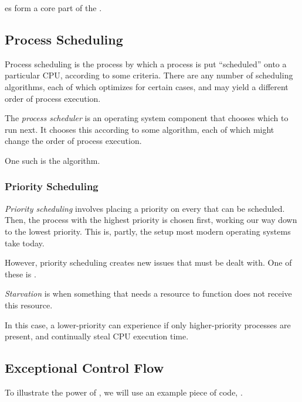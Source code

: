 es form a core part of the .

\subsection{Process Scheduling}\label{subsec:Process_Scheduling}
Process scheduling is the process by which a process is put ``scheduled'' onto a particular CPU, according to some criteria.
There are any number of scheduling algorithms, each of which optimizes for certain cases, and may yield a different order of process execution.
\begin{definition}\label{def:Process_Scheduler}
  The \emph{process scheduler} is an operating system component that chooses which  to run next.
  It chooses this according to some algorithm, each of which might change the order of process execution.
\end{definition}

One such  is the  algorithm.

\subsubsection{Priority Scheduling}\label{subsubsec:Priority_Scheduling}
\emph{Priority scheduling} involves placing a priority on every  that can be scheduled.
Then, the process with the highest priority is chosen first, working our way down to the lowest priority.
This is, partly, the setup most modern operating systems take today.

However, priority scheduling creates new issues that must be dealt with.
One of these is .

\begin{definition}[Starvation]\label{def:Starvation}
  \emph{Starvation} is when something that needs a resource to function does not receive this resource.
\end{definition}

In this case, a lower-priority  can experience  if only higher-priority processes are present, and continually steal CPU execution time.

\subsection{Exceptional Control Flow}\label{subsec:Exceptional_Control_Flow}
To illustrate the power of , we will use an example piece of code, .

